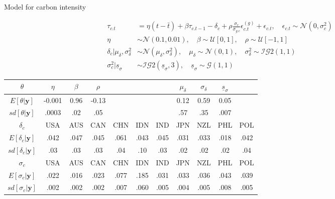 \documentclass[notes,blackandwhite,mathsans,usenames,dvipsnames]{beamer}
\begin{document}
\begin{frame}{Model for carbon intensity}

\small
\begin{align*}
\tau_{c.t} &= \eta (t-\bar{t}) + \beta \tau_{c.t-1} - \delta_{c} + \rho\frac{\sigma_c}{\sigma_{g.c}}\epsilon_{c.t}^{(g)} + \epsilon_{c.t},\quad
\epsilon_{c.t} \sim\mathcal{N}\left( 0,\sigma_{c}^2 \right)\\[1ex]
\eta&\sim \mathcal{N}\left( 0.1,0.01 \right),\quad
\beta\sim \mathcal{U}[0,1],\quad
\rho\sim\mathcal{U}[-1,1]\\
\delta_c|\mu_\delta,\sigma_\delta^2&\sim\mathcal{N}\left(\mu_\delta,\sigma_\delta^2\right) ,\quad
\mu_\delta\sim\mathcal{N}(0,1), \quad
\sigma_\delta^2 \sim\mathcal{IG}2(1,1) \\
\sigma_{c}^2|\underline{s}_\sigma &\sim\mathcal{IG}2\left(\underline{s}_\sigma,3\right),\quad
\underline{s}_\sigma \sim\mathcal{G}(1,1)
\end{align*}

\begin{adjustwidth}{-0.5cm}{0cm}
\scriptsize
\begin{center}
\begin{tabular}{ccccccccccc}
\toprule
$\theta$ & $\eta$ & $\beta$ & $\rho$&&&&$\mu_\delta$ & $\sigma_\delta$ & $\underline{s}_\sigma$&\\
\midrule
$E[\theta|\mathbf{y}]$ & -0.001&  0.96& -0.13&&&&0.12 & 0.59 & 0.05&\\
$sd[\theta|\mathbf{y}]$ &.0003 &.02 &.05&&&&.57 & .35 & .007&\\[1ex]
\midrule
$\delta_c$ &USA&AUS&CAN&CHN&IDN&IND&JPN&NZL&PHL&POL\\
\midrule
$E[\delta_c|\mathbf{y}]$ &.042&  .047&  .045&  .061&  .043&  .045&  .031&  .033&  .018&  .042\\
$sd[\delta_c|\mathbf{y}]$ &.03& .03& .03& .04& .10& .03& .02& .02& .02& .04\\ [1ex]
\midrule
$\sigma_c$ &USA&AUS&CAN&CHN&IDN&IND&JPN&NZL&PHL&POL\\
\midrule
$E[\sigma_{c}|\mathbf{y}]$&.022& .016& .023& .077& .185& .031& .033& .036& .043& .039\\
$sd[\sigma_{c}|\mathbf{y}]$&.002& .002& .002& .007& .060& .005& .004& .005& .008& .005\\
\bottomrule
\end{tabular}
\end{center}
\end{adjustwidth}
\end{frame}
\end{document}
